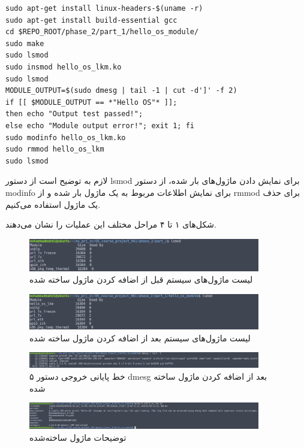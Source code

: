 \documentclass{article}
\begin{document}
\begin{latin}
\begin{verbatim}
sudo apt-get install linux-headers-$(uname -r)
sudo apt-get install build-essential gcc
cd $REPO_ROOT/phase_2/part_1/hello_os_module/
sudo make
sudo lsmod
sudo insmod hello_os_lkm.ko
sudo lsmod
MODULE_OUTPUT=$(sudo dmesg | tail -1 | cut -d']' -f 2)
if [[ $MODULE_OUTPUT == *"Hello OS"* ]];
then echo "Output test passed!";
else echo "Module output error!"; exit 1; fi
sudo modinfo hello_os_lkm.ko
sudo rmmod hello_os_lkm
sudo lsmod
\end{verbatim}
\end{latin}
لازم به توضیح است از دستور lsmod برای نمایش‌ دادن ماژول‌های بار شده، از دستور modinfo برای نمایش اطلاعات مربوط به یک ماژول بار شده و از rmmod برای حذف یک ماژول استفاده می‌کنیم.

شکل‌های ۱ تا ۴ مراحل مختلف این عملیات را نشان می‌دهند.

\begin{figure}[ht]
	\centering	
	\includegraphics[width = 0.9\textwidth]{images/part_1/1.png}
	\caption{لیست ماژول‌های سیستم قبل از اضافه کردن ماژول ساخته شده}
\end{figure}


\begin{figure}[ht]
	\centering	
	\includegraphics[width = 0.9\textwidth]{images/part_1/2.png}
	\caption{لیست ماژول‌های سیستم بعد از اضافه کردن ماژول ساخته شده}
\end{figure}


\begin{figure}[ht]
	\centering	
	\includegraphics[width = 0.9\textwidth]{images/part_1/3.png}
	\caption{۵ خط پایانی خروجی دستور dmesg بعد از اضافه کردن ماژول ساخته شده}
\end{figure}


\begin{figure}[ht]
	\centering	
	\includegraphics[width = 0.9\textwidth]{images/part_1/4.png}
	\caption{توضیحات ماژول ساخته‌شده}
\end{figure}
\end{document}
